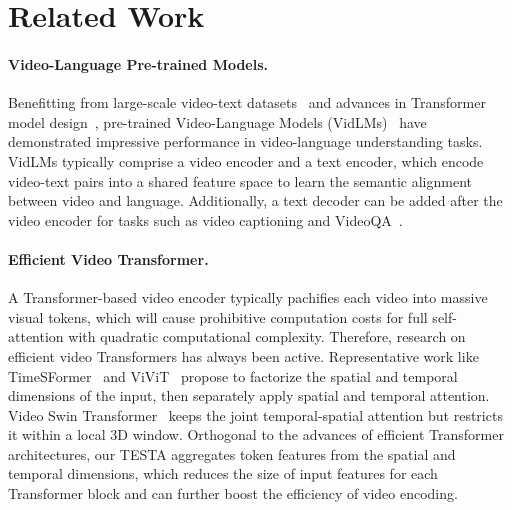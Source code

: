\documentclass[11pt]{article}
\newcommand{\modelname}{TESTA\xspace}
\begin{document}
\section{Related Work}
\label{sec:relate-work}

\paragraph{Video-Language Pre-trained Models.}
Benefitting from large-scale video-text datasets~\citep{Bain2021FrozenIT, Xue2021AdvancingHV} and advances in Transformer model design~\citep{Gorti2022XPoolCL, Ren2021LearningRA, Fu2021VIOLETE, Zellers2021MERLOTMN, Wang2022AllIO}, 
pre-trained Video-Language Models (VidLMs)~\citep{Chen2022LiteVLEV, Sun2022LongFormVP, Cheng2022VindLUAR} have demonstrated impressive performance in video-language understanding tasks. 
VidLMs typically comprise a video encoder and a text encoder, which encode video-text pairs into a shared feature space to learn the semantic alignment between video and language. 
Additionally, a text decoder can be added after the video encoder for tasks such as video captioning and VideoQA~\citep{Yan2022VideoTextMW, Zhang2020DCADC}.

\paragraph{Efficient Video Transformer.}
A Transformer-based video encoder typically pachifies each video into massive visual tokens, which will cause prohibitive computation costs for full self-attention with quadratic computational complexity. 
Therefore, research on efficient video Transformers has always been active. 
Representative work like TimeSFormer~\citep{Bertasius2021IsSA} and ViViT~\citep{Arnab2021ViViTAV} propose to factorize the spatial and temporal dimensions of the input, then separately apply spatial and temporal attention. 
Video Swin Transformer~\citep{Liu2021VideoST} keeps the joint temporal-spatial attention but restricts it within a local 3D window. 
Orthogonal to the advances of efficient Transformer architectures, our \modelname aggregates token features from the spatial and temporal dimensions, which reduces the size of input features for each Transformer block and can further boost the efficiency of video encoding. 
\end{document}
